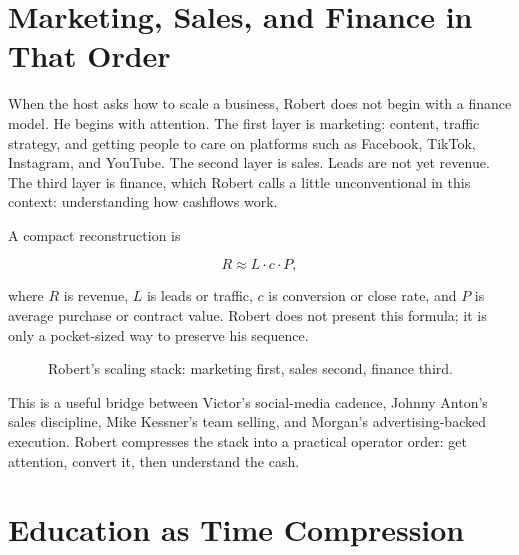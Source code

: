 \documentclass[11pt,oneside]{book}
\begin{document}
\section{Marketing, Sales, and Finance in That Order}

When the host asks how to scale a business, Robert does not begin with a finance model. He begins with attention. The first layer is marketing: content, traffic strategy, and getting people to care on platforms such as Facebook, TikTok, Instagram, and YouTube. The second layer is sales. Leads are not yet revenue. The third layer is finance, which Robert calls a little unconventional in this context: understanding how cashflows work.

A compact reconstruction is

\begin{equation}
R \approx L\cdot c\cdot P,
\end{equation}

where \(R\) is revenue, \(L\) is leads or traffic, \(c\) is conversion or close rate, and \(P\) is average purchase or contract value. Robert does not present this formula; it is only a pocket-sized way to preserve his sequence.

\begin{figure}
\centering
{}
\caption{Robert's scaling stack: marketing first, sales second, finance third.}
\end{figure}

This is a useful bridge between Victor's social-media cadence, Johnny Anton's sales discipline, Mike Kessner's team selling, and Morgan's advertising-backed execution. Robert compresses the stack into a practical operator order: get attention, convert it, then understand the cash.

\section{Education as Time Compression}
\end{document}
